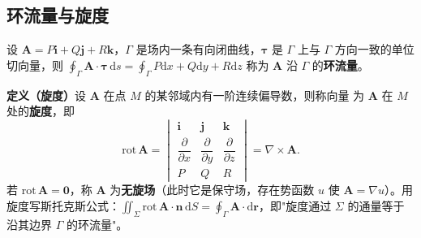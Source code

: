 \subsection{环流量与旋度}

设 $\boldsymbol A=P\boldsymbol i+Q\boldsymbol j+R\boldsymbol k$，$\Gamma$ 是场内一条有向闭曲线，$\boldsymbol\tau$ 是 $\Gamma$ 上与 $\Gamma$ 方向一致的单位切向量，则 $\oint_\Gamma\boldsymbol A\cdot\boldsymbol\tau\,\mathrm{d}s=\oint_\Gamma P\mathrm{d}x+Q\mathrm{d}y+R\mathrm{d}z$ 称为 $\boldsymbol A$ 沿 $\Gamma$ 的\textbf{环流量}。

\textbf{定义（旋度）}\quad 设 $\boldsymbol A$ 在点 $M$ 的某邻域内有一阶连续偏导数，则称向量
为 $\boldsymbol A$ 在 $M$ 处的\textbf{旋度}，即
\[
\mathrm{rot}\,\boldsymbol A=
\begin{vmatrix}
\boldsymbol i & \boldsymbol j & \boldsymbol k\\[6pt]
\dfrac{\partial}{\partial x} & \dfrac{\partial}{\partial y} & \dfrac{\partial}{\partial z}\\[8pt]
P & Q & R
\end{vmatrix}
=\nabla\times\boldsymbol A .
\]
若 $\mathrm{rot}\,\boldsymbol A=\boldsymbol 0$，称 $\boldsymbol A$ 为\textbf{无旋场}（此时它是保守场，存在势函数 $u$ 使 $\boldsymbol A=\nabla u$）。用旋度写斯托克斯公式：$\iint_\Sigma\mathrm{rot}\,\boldsymbol A\cdot\boldsymbol n\,\mathrm{d}S=\oint_\Gamma\boldsymbol A\cdot\mathrm{d}\boldsymbol r$，即"旋度通过 $\Sigma$ 的通量等于沿其边界 $\Gamma$ 的环流量"。

